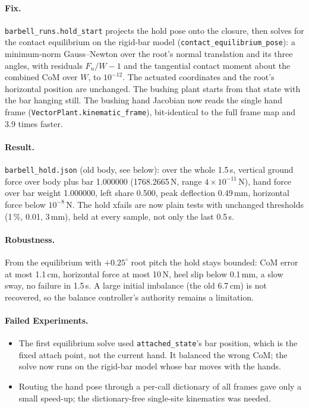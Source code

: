\documentclass[11pt,a4paper]{article}
\begin{document}
\paragraph{Fix.} \texttt{barbell\_runs.hold\_start} projects the hold pose
onto the closure, then solves for the contact equilibrium on the
rigid-bar model (\texttt{contact\_equilibrium\_pose}): a minimum-norm
Gauss--Newton over the root's normal translation and its three angles,
with residuals $F_n/W-1$ and the tangential contact moment about the
combined CoM over $W$, to $10^{-12}$. The actuated coordinates and the
root's horizontal position are unchanged. The bushing plant starts from
that state with the bar hanging still. The bushing hand Jacobian now reads
the single hand frame (\texttt{VectorPlant.kinematic\_frame}), bit-identical
to the full frame map and 3.9 times faster.

\paragraph{Result.} \texttt{barbell\_hold.json} (old body, see below): over
the whole 1.5\,s, vertical ground force over body plus bar 1.000000
(1768.2665\,N, range $4\times10^{-11}$\,N), hand force over bar weight
1.000000, left share 0.500, peak deflection 0.49\,mm, horizontal force
below $10^{-8}$\,N. The hold xfails are now plain tests with unchanged
thresholds (1\,\%, 0.01, 3\,mm), held at every sample, not only the last
0.5\,s.

\paragraph{Robustness.} From the equilibrium with $+0.25^\circ$ root pitch
the hold stays bounded: CoM error at most 1.1\,cm, horizontal force at
most 10\,N, heel slip below 0.1\,mm, a slow sway, no failure in 1.5\,s.
A large initial imbalance (the old 6.7\,cm) is not recovered, so the
balance controller's authority remains a limitation.

\paragraph{Failed Experiments.}
\begin{itemize}[nosep]
\item The first equilibrium solve used \texttt{attached\_state}'s bar
  position, which is the fixed attach point, not the current hand. It
  balanced the wrong CoM; the solve now runs on the rigid-bar model whose
  bar moves with the hands.
\item Routing the hand pose through a per-call dictionary of all frames
  gave only a small speed-up; the dictionary-free single-site kinematics
  was needed.
\end{itemize}
\end{document}
